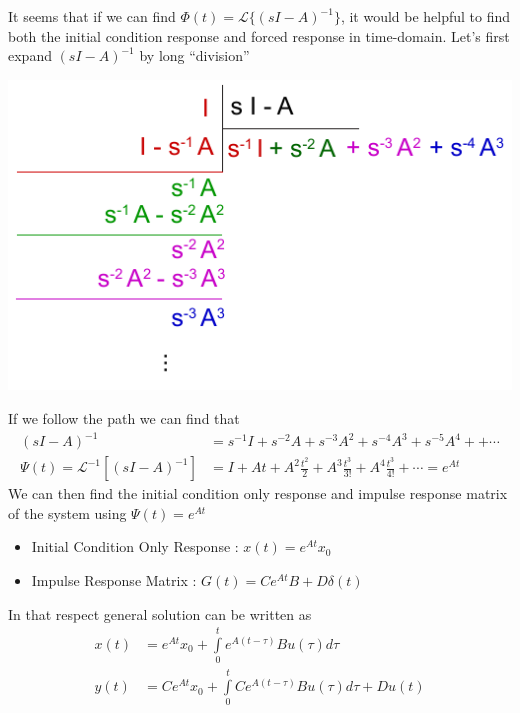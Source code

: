 \documentclass[twoside]{article}
\begin{document}
It seems that if we can find $\Phi(t) = \mathcal{L}\lbrace (sI - A)^{-1} \rbrace$, it would be helpful to
find both the initial condition response and forced response in time-domain.
Let's first expand $\left( s I - A \right)^{-1}$ by long ``division'' 
%
     \begin{center}
 \begin{minipage}[h]{0.5\linewidth}
     \begin{center}
       \includegraphics[width=\textwidth]{s_directdivision}
     \end{center}
 \end{minipage}
     \end{center}
%
If we follow the path we can find that 
%
\begin{align*}
\left( s I - A \right)^{-1} &= s^{-1} I + s^{-2} A + s^{-3} A^2 +
                              s^{-4} A^3 +  s^{-5} A^4 + 
  + \cdots
\\
\Psi(t) = \mathcal{L}^{-1} \left[ \left( s I - A \right)^{-1} \right] &= I + A t
  + A^2 \frac{t^2}{2} + A^3 \frac{t^3}{3 !} + A^4 \frac{t^3}{4 !} + 
                                                              \cdots =
                                                                        e^{A t}
\end{align*}
%
We can then find the initial condition only response and impulse response
matrix of the system using $\Psi(t) = e^{A t}$
%
\begin{itemize}
\item Initial Condition Only Response : $x(t) = e^{A t} x_0$
\item Impulse Response Matrix :  $ G(t) = C e^{A t} B + D \delta(t) $
\end{itemize}
%
In that respect general solution can be written as
%
\begin{align*}
  x(t) &= e^{A t} x_0 + \int\limits_{0}^{t} e^{A ( t - \tau ) } B u(\tau) d
                  \tau
\\
  y(t) &= C e^{A t} x_0 + \int\limits_{0}^{t} C e^{A ( t - \tau ) } B u(\tau) d
                  \tau + D u(t)
\end{align*}
\end{document}
